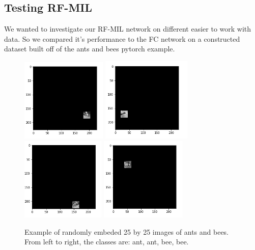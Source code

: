 \documentclass[twocolumn,10pt]{article}
\begin{document}
\subsection{Testing RF-MIL}

We wanted to investigate our RF-MIL network on different easier to work with data. So we compared it's performance to the FC network on a constructed dataset built off of the ants and bees pytorch example. 

\begin{figure}
\label{ants_bees_imgs}
\begin{center}
\includegraphics[width=11em]{imgs/ant1.png}
\includegraphics[width=11.5em]{imgs/ant2.png}
\includegraphics[width=10.8em]{imgs/bee1.png}
\includegraphics[width=11.1em]{imgs/bee2.png}
\end{center}
\caption{Example of randomly embeded 25 by 25 images of ants and bees. 
From left to right, the classes are: ant, ant, bee, bee.}
\end{figure}
\end{document}
